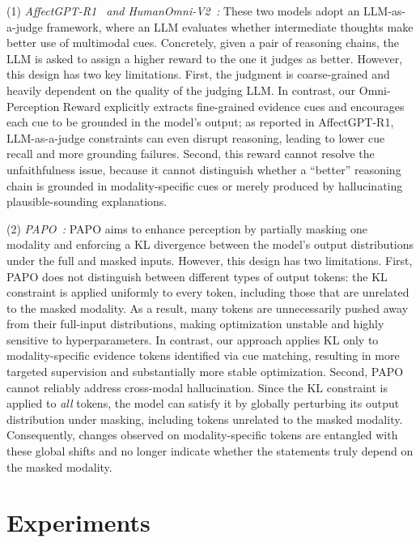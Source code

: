 \documentclass{article}
\theoremstyle{plain}
\theoremstyle{definition}
\theoremstyle{remark}
\begin{document}
(1) \textit{AffectGPT-R1~\cite{lian2025affectgptr1} and HumanOmni-V2~\cite{yang2025humanomniv2}:}
These two models adopt an LLM-as-a-judge framework, where an LLM evaluates whether intermediate thoughts make better use of multimodal cues. Concretely, given a pair of reasoning chains, the LLM is asked to assign a higher reward to the one it judges as better.
However, this design has two key limitations. First, the judgment is coarse-grained and heavily dependent on the quality of the judging LLM. In contrast, our Omni-Perception Reward explicitly extracts fine-grained evidence cues and encourages each cue to be grounded in the model’s output; as reported in AffectGPT-R1, LLM-as-a-judge constraints can even disrupt reasoning, leading to lower cue recall and more grounding failures. Second, this reward cannot resolve the unfaithfulness issue, because it cannot distinguish whether a ``better'' reasoning chain is grounded in modality-specific cues or merely produced by hallucinating plausible-sounding explanations.

(2) \textit{PAPO~\cite{wang2025perception}:}
PAPO aims to enhance perception by partially masking one modality and enforcing a KL divergence between the model’s output distributions under the full and masked inputs. 
However, this design has two limitations. First, PAPO does not distinguish between different types of output tokens: the KL constraint is applied uniformly to every token, including those that are unrelated to the masked modality. As a result, many tokens are unnecessarily pushed away from their full-input distributions, making optimization unstable and highly sensitive to hyperparameters. In contrast, our approach applies KL only to modality-specific evidence tokens identified via cue matching, resulting in more targeted supervision and substantially more stable optimization.
Second, PAPO cannot reliably address cross-modal hallucination. Since the KL constraint is applied to \emph{all} tokens, the model can satisfy it by globally perturbing its output distribution under masking, including tokens unrelated to the masked modality. Consequently, changes observed on modality-specific tokens are entangled with these global shifts and no longer indicate whether the statements truly depend on the masked modality.





\section{Experiments}
\label{sec:experiments}
\end{document}
